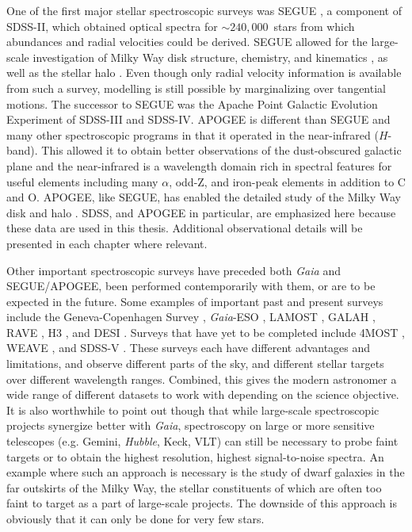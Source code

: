 One of the first major stellar spectroscopic surveys was SEGUE \parencite{segue}, a component of SDSS-II, which obtained optical spectra for $\sim 240,000$~stars from which abundances and radial velocities could be derived. SEGUE allowed for the large-scale investigation of Milky Way disk structure, chemistry, and kinematics \parencite[e.g.][]{bovy12c,bovy12d,schonrich12,bovy13}, as well as the stellar halo \parencite[e.g.][]{ivezic08,bond10}. Even though only radial velocity information is available from such a survey, modelling is still possible by marginalizing over tangential motions. The successor to SEGUE was the Apache Point Galactic Evolution Experiment \parencite[APOGEE][]{apogee} of SDSS-III and SDSS-IV. APOGEE is different than SEGUE and many other spectroscopic programs in that it operated in the near-infrared ($H$-band). This allowed it to obtain better observations of the dust-obscured galactic plane and the near-infrared is a wavelength domain rich in spectral features for useful elements including many $\alpha$, odd-Z, and iron-peak elements in addition to C and O. APOGEE, like SEGUE, has enabled the detailed study of the Milky Way disk and halo \parencite[see][for a few examples of noteworthy results]{bovy12a,hayden15,mackereth19a}. SDSS, and APOGEE in particular, are emphasized here because these data are used in this thesis. Additional observational details will be presented in each chapter where relevant.

Other important spectroscopic surveys have preceded both \textit{Gaia} and SEGUE/APOGEE, been performed contemporarily with them, or are to be expected in the future. Some examples of important past and present surveys include the Geneva-Copenhagen Survey \parencite{gcs}, \textit{Gaia}-ESO \parencite{gaiaeso}, LAMOST \parencite{lamost}, GALAH \parencite{galah}, RAVE \parencite{ravedr16}, H3 \parencite{h3}, and DESI \parencite{desi}. Surveys that have yet to be completed include 4MOST \parencite{4most}, WEAVE \parencite{weave}, and SDSS-V \parencite{sdss5}. These surveys each have different advantages and limitations, and observe different parts of the sky, and different stellar targets over different wavelength ranges. Combined, this gives the modern astronomer a wide range of different datasets to work with depending on the science objective. It is also worthwhile to point out though that while large-scale spectroscopic projects synergize better with \textit{Gaia}, spectroscopy on large or more sensitive telescopes (e.g. Gemini, \textit{Hubble}, Keck, VLT) can still be necessary to probe faint targets or to obtain the highest resolution, highest signal-to-noise spectra. An example where such an approach is necessary is the study of dwarf galaxies in the far outskirts of the Milky Way, the stellar constituents of which are often too faint to target as a part of large-scale projects. The downside of this approach is obviously that it can only be done for very few stars.



